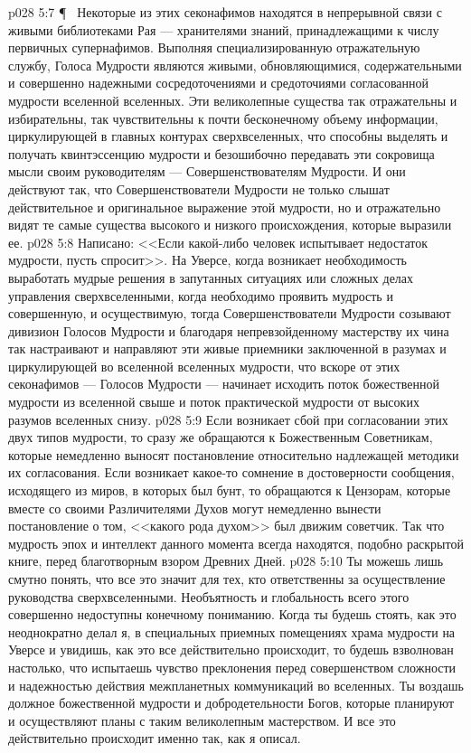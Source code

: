 \vs p028 5:7 \P\ \bibnobreakspace {} Некоторые из этих секонафимов находятся в непрерывной связи с живыми библиотеками Рая --- хранителями знаний, принадлежащими к числу первичных супернафимов. Выполняя специализированную отражательную службу, Голоса Мудрости являются живыми, обновляющимися, содержательными и совершенно надежными сосредоточениями и средоточиями согласованной мудрости вселенной вселенных. Эти великолепные существа так отражательны и избирательны, так чувствительны к почти бесконечному объему информации, циркулирующей в главных контурах сверхвселенных, что способны выделять и получать квинтэссенцию мудрости и безошибочно передавать эти сокровища мысли своим руководителям --- Совершенствователям Мудрости. И они действуют так, что Совершенствователи Мудрости не только слышат действительное и оригинальное выражение этой мудрости, но и отражательно видят те самые существа высокого и низкого происхождения, которые выразили ее.
\vs p028 5:8 Написано: <<Если какой\hyp{}либо человек испытывает недостаток мудрости, пусть спросит>>. На Уверсе, когда возникает необходимость выработать мудрые решения в запутанных ситуациях или сложных делах управления сверхвселенными, когда необходимо проявить мудрость и совершенную, и осуществимую, тогда Совершенствователи Мудрости созывают дивизион Голосов Мудрости и благодаря непревзойденному мастерству их чина так настраивают и направляют эти живые приемники заключенной в разумах и циркулирующей во вселенной вселенных мудрости, что вскоре от этих секонафимов --- Голосов Мудрости --- начинает исходить поток божественной мудрости из вселенной свыше и поток практической мудрости от высоких разумов вселенных снизу.
\vs p028 5:9 Если возникает сбой при согласовании этих двух типов мудрости, то сразу же обращаются к Божественным Советникам, которые немедленно выносят постановление относительно надлежащей методики их согласования. Если возникает какое\hyp{}то сомнение в достоверности сообщения, исходящего из миров, в которых был бунт, то обращаются к Цензорам, которые вместе со своими Различителями Духов могут немедленно вынести постановление о том, <<какого рода духом>> был движим советчик. Так что мудрость эпох и интеллект данного момента всегда находятся, подобно раскрытой книге, перед благотворным взором Древних Дней.
\vs p028 5:10 Ты можешь лишь смутно понять, что все это значит для тех, кто ответственны за осуществление руководства сверхвселенными. Необъятность и глобальность всего этого совершенно недоступны конечному пониманию. Когда ты будешь стоять, как это неоднократно делал я, в специальных приемных помещениях храма мудрости на Уверсе и увидишь, как это все действительно происходит, то будешь взволнован настолько, что испытаешь чувство преклонения перед совершенством сложности и надежностью действия межпланетных коммуникаций во вселенных. Ты воздашь должное божественной мудрости и добродетельности Богов, которые планируют и осуществляют планы с таким великолепным мастерством. И все это действительно происходит именно так, как я описал.
